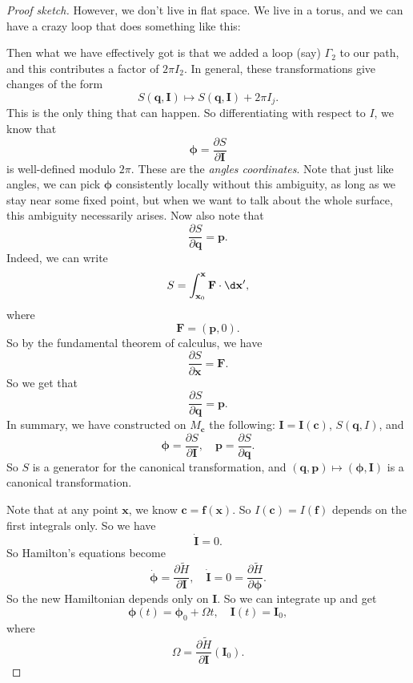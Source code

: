 \documentclass[a4paper]{article}
\begin{document}
\begin{proof}[Proof sketch]
  However, we don't live in flat space. We live in a torus, and we can have a crazy loop that does something like this:
  \begin{center}
  \end{center}
  Then what we have effectively got is that we added a loop (say) $\Gamma_2$ to our path, and this contributes a factor of $2\pi I_2$. In general, these transformations give changes of the form
  \[
    S(\mathbf{q}, \mathbf{I}) \mapsto S(\mathbf{q}, \mathbf{I}) + 2\pi I_j.
  \]
  This is the only thing that can happen. So differentiating with respect to $I$, we know that
  \[
    \boldsymbol\phi = \frac{\partial S}{\partial \mathbf{I}}
  \]
  is well-defined modulo $2\pi$. These are the \emph{angles coordinates}. Note that just like angles, we can pick $\boldsymbol\phi$ consistently locally without this ambiguity, as long as we stay near some fixed point, but when we want to talk about the whole surface, this ambiguity necessarily arises. Now also note that
  \[
    \frac{\partial S}{\partial \mathbf{q}} = \mathbf{p}.
  \]
  Indeed, we can write
  \[
    S = \int_{\mathbf{x}_0}^\mathbf{x} \mathbf{F} \cdot \d \mathbf{x}',
  \]
  where
  \[
    \mathbf{F} = (\mathbf{p}, 0).
  \]
  So by the fundamental theorem of calculus, we have
  \[
    \frac{\partial S}{\partial \mathbf{x}} = \mathbf{F}.
  \]
  So we get that
  \[
    \frac{\partial S}{\partial \mathbf{q}} = \mathbf{p}.
  \]
  In summary, we have constructed on $M_\mathbf{c}$ the following: $\mathbf{I}= \mathbf{I}(\mathbf{c})$, $S(\mathbf{q}, I)$, and
  \[
    \boldsymbol\phi = \frac{\partial S}{\partial \mathbf{I}},\quad \mathbf{p} = \frac{\partial S}{\partial \mathbf{q}}.
  \]
  So $S$ is a generator for the canonical transformation, and $(\mathbf{q}, \mathbf{p}) \mapsto (\boldsymbol\phi, \mathbf{I})$ is a canonical transformation.

  Note that at any point $\mathbf{x}$, we know $\mathbf{c} = \mathbf{f}(\mathbf{x})$. So $I(\mathbf{c}) = I(\mathbf{f})$ depends on the first integrals only. So we have
  \[
    \dot{\mathbf{I}} = 0.
  \]
  So Hamilton's equations become
  \[
    \dot{\boldsymbol\phi} = \frac{\partial \tilde{H}}{\partial \mathbf{I}},\quad \dot{\mathbf{I}} = 0 = \frac{\partial \tilde{H}}{\partial \boldsymbol\phi}.
  \]
  So the new Hamiltonian depends only on $\mathbf{I}$. So we can integrate up and get
  \[
    \boldsymbol\phi(t) = \boldsymbol\phi_0 + \Omega t,\quad \mathbf{I}(t) = \mathbf{I}_0,
  \]
  where
  \[
    \Omega = \frac{\partial\tilde{H}}{\partial \mathbf{I}}(\mathbf{I}_0).
  \]
\end{proof}
\end{document}
